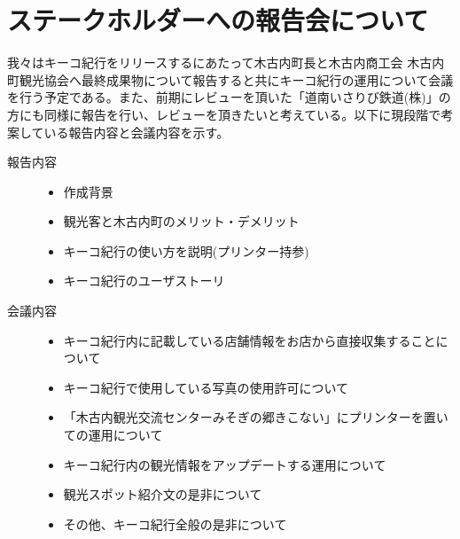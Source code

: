 \section{ステークホルダーへの報告会について}
我々はキーコ紀行をリリースするにあたって木古内町長と木古内商工会 木古内町観光協会へ最終成果物について報告すると共にキーコ紀行の運用について会議を行う予定である。また、前期にレビューを頂いた「道南いさりび鉄道(株)」の方にも同様に報告を行い、レビューを頂きたいと考えている。以下に現段階で考案している報告内容と会議内容を示す。
\begin{description}
 \item[報告内容]\mbox{}
 	\begin{itemize}
	\item 作成背景
	\item 観光客と木古内町のメリット・デメリット
	\item キーコ紀行の使い方を説明(プリンター持参)
	\item キーコ紀行のユーザストーリ \\
	\end{itemize}
 \item[会議内容]\mbox{}
	\begin{itemize}
	\item キーコ紀行内に記載している店舗情報をお店から直接収集することについて
	\item キーコ紀行で使用している写真の使用許可について
	\item 「木古内観光交流センターみそぎの郷きこない」にプリンターを置いての運用について
	\item キーコ紀行内の観光情報をアップデートする運用について
	\item 観光スポット紹介文の是非について
	\item その他、キーコ紀行全般の是非について
	\end{itemize}
\end{description}

